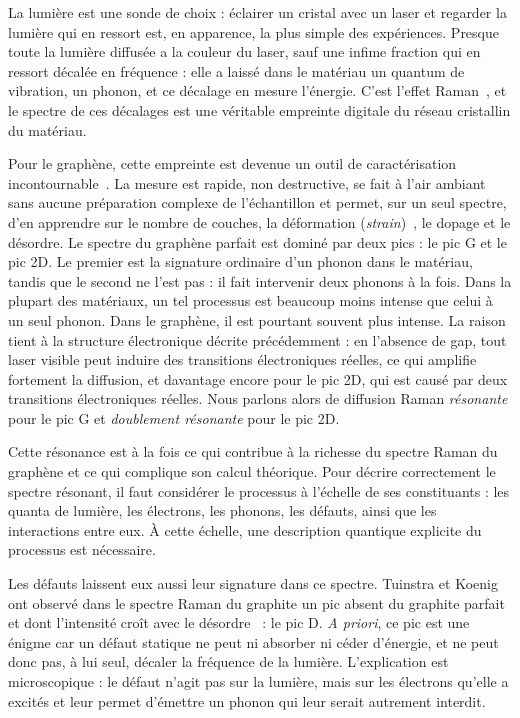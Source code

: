 \bigskip
{}

La lumière est une sonde de choix : éclairer un cristal avec un laser et regarder la lumière qui en ressort est, en apparence, la plus simple des expériences. Presque toute la lumière diffusée a la couleur du laser, sauf une infime fraction qui en ressort décalée en fréquence : elle a laissé dans le matériau un quantum de vibration, un phonon, et ce décalage en mesure l'énergie. C'est l'effet Raman~\cite{ramanNewTypeSecondary1928}, et le spectre de ces décalages est une véritable empreinte digitale du réseau cristallin du matériau.

Pour le graphène, cette empreinte est devenue un outil de caractérisation incontournable~\cite{ferrariRamanSpectrumGraphene2006,ferrariRamanSpectroscopyVersatile2013a}. La mesure est rapide, non destructive, se fait à l'air ambiant sans aucune préparation complexe de l'échantillon et permet, sur un seul spectre, d'en apprendre sur le nombre de couches, la déformation (\textit{strain})~\cite{mohiuddinUniaxialStrainGraphene2009}, le dopage et le désordre. Le spectre du graphène parfait est dominé par deux pics : le pic G et le pic 2D. Le premier est la signature ordinaire d'un phonon dans le matériau, tandis que le second ne l'est pas : il fait intervenir deux phonons à la fois. Dans la plupart des matériaux, un tel processus est beaucoup moins intense que celui à un seul phonon. Dans le graphène, il est pourtant souvent plus intense. La raison tient à la structure électronique décrite précédemment : en l'absence de gap, tout laser visible peut induire des transitions électroniques réelles, ce qui amplifie fortement la diffusion, et davantage encore pour le pic 2D, qui est causé par deux transitions électroniques réelles. Nous parlons alors de diffusion Raman \textit{résonante} pour le pic G et \textit{doublement résonante} pour le pic 2D.

Cette résonance est à la fois ce qui contribue à la richesse du spectre Raman du graphène et ce qui complique son calcul théorique. Pour décrire correctement le spectre résonant, il faut considérer le processus à l'échelle de ses constituants : les quanta de lumière, les électrons, les phonons, les défauts, ainsi que les interactions entre eux. À cette échelle, une description quantique explicite du processus est nécessaire.

Les défauts laissent eux aussi leur signature dans ce spectre. Tuinstra et Koenig ont observé dans le spectre Raman du graphite un pic absent du graphite parfait et dont l'intensité croît avec le désordre~\cite{tuinstraRamanSpectrumGraphite1970} : le pic D. \textit{A priori}, ce pic est une énigme car un défaut statique ne peut ni absorber ni céder d'énergie, et ne peut donc pas, à lui seul, décaler la fréquence de la lumière. L'explication est microscopique : le défaut n'agit pas sur la lumière, mais sur les électrons qu'elle a excités et leur permet d'émettre un phonon qui leur serait autrement interdit.


